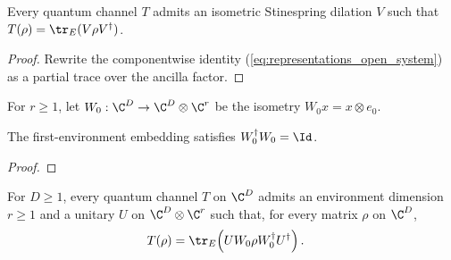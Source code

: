 \begin{theorem}
    \label{thm:channel_exists_stinespring_open_system_traceRight}
    \leanok
    Every quantum channel $T$ admits an isometric Stinespring dilation
    $V$ such that $T(\rho)=\tr_E(V\rho V^\dagger)$.
\end{theorem}

\begin{proof}\leanok
    Rewrite the componentwise identity
    (\ref{eq:representations_open_system}) as a partial trace over the
    ancilla factor.
\end{proof}

\begin{definition}
    \label{def:first_env_embedding}
    \leanok
    For $r\geq1$, let $W_0:\C^D\to\C^D\otimes\C^r$ be the isometry
    $W_0x=x\otimes e_0$.
\end{definition}

\begin{lemma}
    \label{lem:first_env_embedding_conjTranspose_mul_self}
    \leanok
    The first-environment embedding satisfies $W_0^\dagger W_0=\Id$.
\end{lemma}

\begin{proof}\leanok
\end{proof}

\begin{theorem}
    \label{thm:channel_exists_stinespring_open_system_unitary}
    \leanok
    For $D\geq1$, every quantum channel $T$ on $\C^D$ admits an
    environment dimension $r\geq1$ and a unitary
    $U$ on $\C^D\otimes\C^r$ such that, for every matrix
    $\rho$ on $\C^D$,
    \begin{align}
        T(\rho)
        &=\tr_E\!\left(UW_0\rho W_0^\dagger U^\dagger\right).
        \label{eq:representations_open_unitary}
    \end{align}
\end{theorem}

